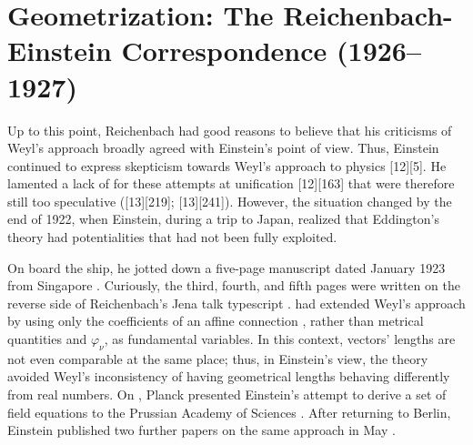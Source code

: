 \documentclass[final]{article}
\newcommand{\phin}{\ensuremath{\varphi_\nu}\xspace}
\begin{document}
\section{Geometrization: The Reichenbach-Einstein Correspondence (1926--1927)}
\label{geometrization}
%
Up to this point, Reichenbach had good reasons to believe that his criticisms of Weyl's approach broadly agreed with Einstein's point of view. Thus, Einstein continued to express skepticism towards Weyl's  approach to physics  [12][5]. He lamented a lack of  for these attempts at unification [12][163] that were therefore still too speculative ([13][219]; [13][241]). However, the situation changed by the end of 1922, when Einstein, during a trip to Japan, realized that Eddington's theory had potentialities that had not been fully exploited. 

On board the ship, he jotted down a five-page manuscript dated January 1923 from Singapore . Curiously, the third, fourth, and fifth pages were written on the reverse side of Reichenbach's Jena talk typescript \citep{Reichenbach1921}. \citet{Eddington1921} had extended Weyl's approach by using only the coefficients of an affine connection \Gtmn, rather than metrical quantities \gmn and \phin, as fundamental variables. In this context, vectors' lengths are not even comparable at the same place; thus, in Einstein's view, the theory avoided Weyl's inconsistency of having geometrical lengths behaving differently from real numbers. On , Planck presented Einstein's attempt to derive a set of field equations to the Prussian Academy of Sciences \citep{Einstein1923c}. After returning to Berlin, Einstein published two further papers on the same approach in May \cite{Einstein1923c,Einstein1923e}.
\end{document}
